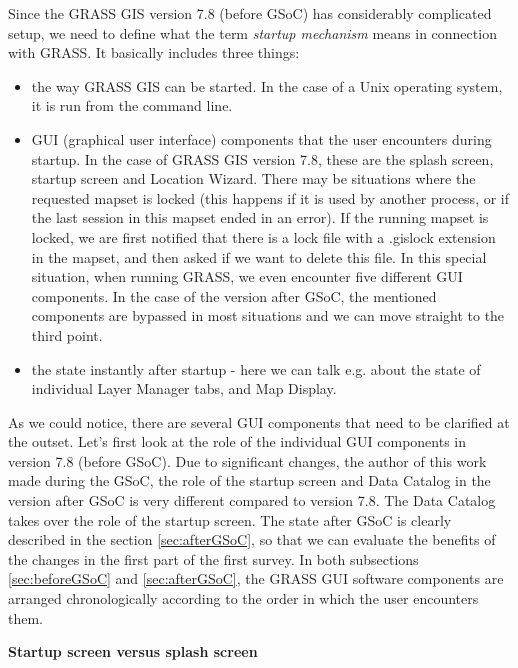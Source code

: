 \documentclass[a4paper,10pt,twoside]{article}
\begin{document}
\noindent Since the GRASS GIS version 7.8 (before GSoC) has considerably complicated setup, we need to define what the term \textit{startup mechanism} means in connection with GRASS. It basically includes three things:  

\begin {itemize}

\item the way GRASS GIS can be started. In the case of a Unix operating system, it is run from the command line.

\item GUI (graphical user interface) components that the user encounters during startup. In the case of GRASS GIS version 7.8, these are the splash screen, startup screen and Location Wizard. There may be situations where the requested mapset is locked (this happens if it is used by another process, or if the last session in this mapset ended in an error). If the running mapset is locked, we are first notified that there is a lock file with a .gislock extension in the mapset, and then asked if we want to delete this file. In this special situation, when running GRASS, we even encounter five different GUI components.
In the case of the version after GSoC, the mentioned components are bypassed in most situations and we can move straight to the third point.

\item the state instantly after startup - here we can talk e.g. about the state of individual Layer Manager tabs, and Map Display.

\end{itemize}

\noindent As we could notice, there are several GUI components that need to be clarified at the outset. Let's first look at the role of the individual GUI components in version 7.8 (before GSoC). Due to significant changes, the author of this work made during the GSoC,  the role of the startup screen and Data Catalog in the version after GSoC is very different compared to version 7.8. The Data Catalog takes over the role of the startup screen. The state after GSoC is clearly described in the section \ref{sec:afterGSoC},  so that we can evaluate the benefits of the changes in the first part of the first survey. In both subsections \ref{sec:beforeGSoC} and \ref{sec:afterGSoC}, the GRASS GUI software components are arranged chronologically according to the order in which the user encounters them.

\bigskip
\noindent \textbf {Startup screen versus splash screen}
\end{document}
